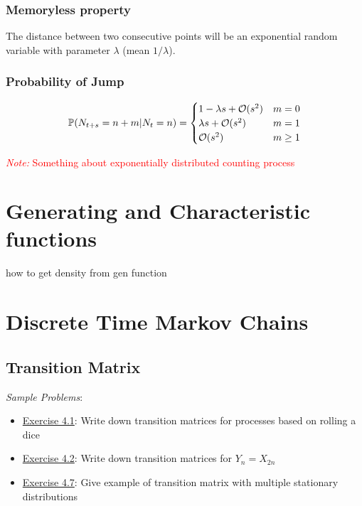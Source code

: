\documentclass[12pt]{article}
\newcommand{\note}[1]{\textcolor{red}{\textit{Note:} #1}}
\begin{document}
\subsubsection{Memoryless property} 
The distance between two consecutive points will be an exponential random variable with parameter \( \lambda \) (mean \( 1/\lambda \)).

\subsubsection{Probability of Jump}
\begin{align*}
    \mathbb{P}(N_{t+s}=n+m | N_t =n) = 
    \begin{cases}
        1-\lambda s + \mathcal{O}(s^2) & m = 0 \\
        \lambda s + \mathcal{O}(s^2) & m = 1 \\
        \mathcal{O}(s^2) & m \geq 1
    \end{cases} 
\end{align*}

\note{Something about exponentially distributed counting process}


\pagebreak
\section{Generating and Characteristic functions}

how to get density from gen function



\pagebreak
\section{Discrete Time Markov Chains}
\subsection{Transition Matrix}
\textit{Sample Problems}: 
\begin{itemize}[nolistsep]
    \item \hyperref[Exercise 4.1]{Exercise 4.1}: Write down transition matrices for processes based on rolling a dice
    \item \hyperref[Exercise 4.2]{Exercise 4.2}: Write down transition matrices for \( Y_n = X_{2n} \)
    \item \hyperref[Exercise 4.7]{Exercise 4.7}: Give example of transition matrix with multiple stationary distributions
\end{itemize}
\end{document}
